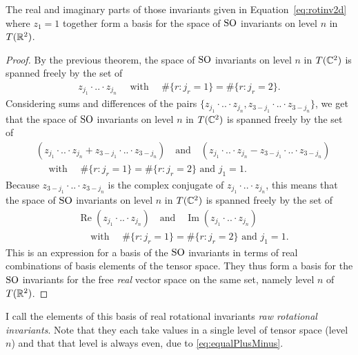 \begin{theorem}
	The real and imaginary parts of those invariants given in Equation~\eqref{eq:rotinv2d} where $z_1=1$ together form a basis for the space of $\operatorname{SO}$ invariants on level $n$ in $T(\mathbb{R}^2)$.
\end{theorem}
\begin{proof}
  	By the previous theorem, the space of $\operatorname{SO}$ invariants on level $n$ in $T(\mathbb{C}^2)$ is spanned freely by the set of
	\begin{align*}
	z_{j_1} \cdot .. \cdot z_{j_n} \quad \text{ with } \quad \#\{ r : j_r = 1 \} = \#\{ r : j_r = 2 \}.
	\end{align*}
        Considering sums and differences of the pairs $\{z_{j_1} \cdot .. \cdot z_{j_n},z_{3-j_1} \cdot .. \cdot z_{3-j_n}\}$, we get that the space of $\operatorname{SO}$ invariants on level $n$ in $T(\mathbb{C}^2)$ is spanned freely by the set of
	\begin{align*}
	 & (z_{j_1} \cdot .. \cdot z_{j_n} + z_{3-j_1} \cdot .. \cdot z_{3-j_n}) \quad\text{and}\quad (z_{j_1} \cdot .. \cdot z_{j_n} - z_{3-j_1} \cdot .. \cdot z_{3-j_n}) 
	 \\&\quad \text{ with } \quad \#\{ r : j_r = 1 \} = \#\{ r : j_r = 2 \}\text{ and $j_1=1$}.
	\end{align*}
	Because $z_{3-j_1} \cdot .. \cdot z_{3-j_n}$ is the complex conjugate of $z_{j_1} \cdot .. \cdot z_{j_n}$, this means that the space of $\operatorname{SO}$ invariants on level $n$ in $T(\mathbb{C}^2)$ is spanned freely by the set of
		\begin{align*}
	& \operatorname{Re}(z_{j_1} \cdot .. \cdot z_{j_n}) \quad\text{and}\quad \operatorname{Im}(z_{j_1} \cdot .. \cdot z_{j_n}) 
	\\&\quad \text{ with } \quad \#\{ r : j_r = 1 \} = \#\{ r : j_r = 2 \}\text{ and $j_1=1$}.
	\end{align*}
	This is an expression for a basis of the $\operatorname{SO}$ invariants in terms of real combinations of basis elements of the tensor space. They thus form a basis for the $\operatorname{SO}$ invariants for the free \emph{real} vector space on the same set, namely level $n$ of $T(\mathbb{R}^2)$.
\end{proof}

I call the elements of this basis of real rotational invariants %
\emph{raw rotational invariants}.
Note that they each take values in a single level of tensor space (level $n$) and that that level is always even, due to \eqref{eq:equalPlusMinus}.

